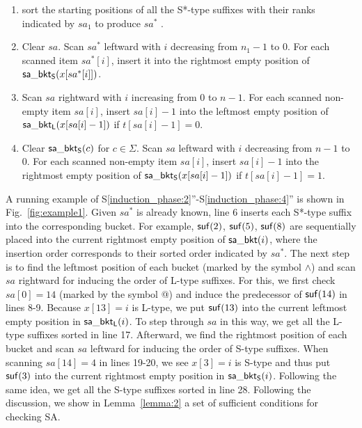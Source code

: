 \documentclass[10pt,journal,compsoc]{IEEEtran}
\begin{document}
\begin{enumerate}[S1'']
	\item sort the starting positions of all the S*-type suffixes with their ranks indicated by $sa_1$ to produce $sa^*$ \label{induction_phase:1}.

	\item Clear $sa$. Scan $sa^*$ leftward with $i$ decreasing from $n_1 - 1$ to $0$. For each scanned item $sa^*[i]$, insert it into the rightmost empty position of ${\sf sa\_bkt_S}(x[sa^*[i]])$. \label{induction_phase:2}
	
	\item Scan $sa$ rightward with $i$ increasing from $0$ to $n - 1$. For each scanned non-empty item $sa[i]$, insert $sa[i] - 1$ into the leftmost empty position of ${\sf sa\_bkt_L}(x[sa[i] - 1])$ if $t[sa[i] - 1] = 0$.\label{induction_phase:3}
	
	\item Clear ${\sf sa\_bkt_S}(c)$ for $c \in \Sigma$. Scan $sa$ leftward with $i$ decreasing from $n - 1$ to $0$. For each scanned non-empty item $sa[i]$, insert $sa[i] - 1$ into the rightmost empty position of ${\sf sa\_bkt_S}(x[sa[i] - 1])$ if $t[sa[i] - 1] = 1$.\label{induction_phase:4}
	
\end{enumerate}

A running example of S\ref{induction_phase:2}''-S\ref{induction_phase:4}'' is shown in Fig.~\ref{fig:example1}. Given $sa^*$ is already known, line 6 inserts each S*-type suffix into the corresponding bucket. For example, ${\sf suf}(2)$, ${\sf suf}(5)$, ${\sf suf}(8)$ are sequentially placed into the current rightmost empty position of ${\sf sa\_bkt}(i)$, where the insertion order corresponds to their sorted order indicated by $sa^*$. The next step is to find the leftmost position of each bucket (marked by the symbol $\wedge$) and scan $sa$ rightward for inducing the order of L-type suffixes. For this, we first check $sa[0] = 14$ (marked by the symbol @) and induce the predecessor of ${\sf suf}(14)$ in lines 8-9. Because $x[13] = i$ is L-type, we put ${\sf suf}(13)$ into the current leftmost empty position in ${\sf sa\_bkt_L}(i)$. To step through $sa$ in this way, we get all the L-type suffixes sorted in line 17. Afterward, we find the rightmost position of each bucket and scan $sa$ leftward for inducing the order of S-type suffixes. When scanning $sa[14] = 4$ in lines 19-20, we see $x[3] = i$ is S-type and thus put ${\sf suf}(3)$ into the current rightmost empty position in ${\sf sa\_bkt_S}(i)$. Following the same idea, we get all the S-type suffixes sorted in line 28. Following the discussion, we show in Lemma~\ref{lemma:2} a set of sufficient conditions for checking SA.
\end{document}
